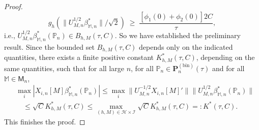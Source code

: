 \documentclass[preprint]{imsart}
\renewcommand{\P}{{\mathbb P}}
\newcommand{\M}{\mathbb M}
\numberwithin{equation}{section}
\begin{document}
\begin{proof}
$$
g_h(\|U_{M,n}^{1/2}\beta_{\M,n}^*\|/\sqrt{2}) \;\ge \; \frac{[\phi_1(0) + \phi_2(0)] 2C}{\tau},
$$
i.e., $U_{M,n}^{1/2}\beta_{\M,n}^*(\P_n)\in B_{h,M}(\tau, C)$. So we have established the preliminary result. 
Since the bounded set $B_{h,M}(\tau, C)$ depends only on the indicated quantities, there exists a finite positive constant $K^*_{h,M}(\tau, C)$, depending on the same quantities, such that for all large $n$, for all $\P_n\in\mathbf{P}_n^{(\mathrm{bin})}(\tau)$ and for all $\M\in\mathsf{M}_n$,
\begin{align*}
&\max_{i}|X_{i,n}[M]\beta_{\M,n}^*(\P_n)| \le \max_i \|U_{M,n}^{-1/2}X_{i,n}[M]'\| \|U_{M,n}^{1/2}\beta_{\M,n}^*(\P_n)\|\\
&\quad\le
\sqrt{C}K_{h,M}^*(\tau, C) \le \max_{(h,M)\in\mathcal H\times \mathcal I}\sqrt{C}K_{h,M}^*(\tau, C) =:K^*(\tau, C).
\end{align*}
This finishes the proof.
\end{proof}
\end{document}
